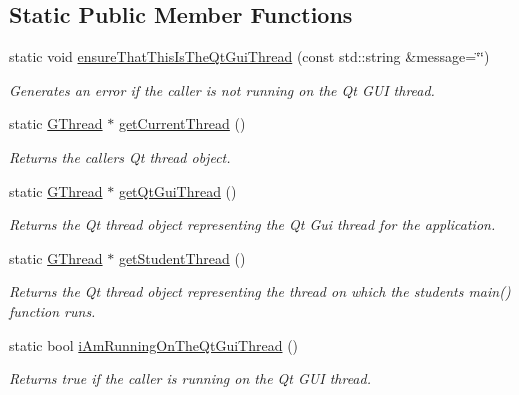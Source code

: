 \subsection*{Static Public Member Functions}
\begin{DoxyCompactItemize}
\item 
static void \mbox{\hyperlink{classsgl_1_1GThread_a27a1f5f9657637e4a4b6a7127ca9da33}{ensure\+That\+This\+Is\+The\+Qt\+Gui\+Thread}} (const std\+::string \&message=\char`\"{}\char`\"{})
\begin{DoxyCompactList}\small\item\em Generates an error if the caller is not running on the Qt G\+UI thread. \end{DoxyCompactList}\item 
static \mbox{\hyperlink{classsgl_1_1GThread}{G\+Thread}} $\ast$ \mbox{\hyperlink{classsgl_1_1GThread_aaa459934e7c2be37d30ed64ab5dd8dbe}{get\+Current\+Thread}} ()
\begin{DoxyCompactList}\small\item\em Returns the caller\textquotesingle{}s Qt thread object. \end{DoxyCompactList}\item 
static \mbox{\hyperlink{classsgl_1_1GThread}{G\+Thread}} $\ast$ \mbox{\hyperlink{classsgl_1_1GThread_ac141b7dd2d0dfa84f52db332569623fc}{get\+Qt\+Gui\+Thread}} ()
\begin{DoxyCompactList}\small\item\em Returns the Qt thread object representing the Qt Gui thread for the application. \end{DoxyCompactList}\item 
static \mbox{\hyperlink{classsgl_1_1GThread}{G\+Thread}} $\ast$ \mbox{\hyperlink{classsgl_1_1GThread_ae3c433f1db9de03fe8a6aa83dbc689ed}{get\+Student\+Thread}} ()
\begin{DoxyCompactList}\small\item\em Returns the Qt thread object representing the thread on which the student\textquotesingle{}s main() function runs. \end{DoxyCompactList}\item 
static bool \mbox{\hyperlink{classsgl_1_1GThread_a410c93ed2a5eb78ea24013ef35e49eed}{i\+Am\+Running\+On\+The\+Qt\+Gui\+Thread}} ()
\begin{DoxyCompactList}\small\item\em Returns true if the caller is running on the Qt G\+UI thread. \end{DoxyCompactList}\item 

\end{DoxyCompactItemize}
